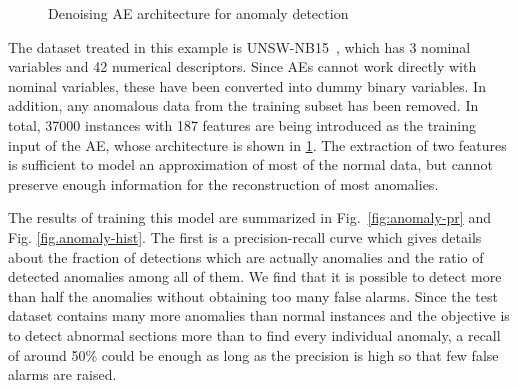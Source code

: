 \begin{figure}[ht]
    \centering\small
    \caption{Denoising AE architecture for anomaly detection}
    \label{fig:anomaly}
\end{figure}


The dataset treated in this example is UNSW-NB15~, which has 3 nominal variables and 42 numerical descriptors. Since AEs cannot work directly with nominal variables, these have been converted into dummy binary variables. In addition, any anomalous data from the training subset has been removed. In total, 37000 instances with 187 features  are being introduced as the training input of the AE, whose architecture is shown in \ref{fig:anomaly}. The extraction of two features is sufficient to model an approximation of most of the normal data, but cannot preserve enough information for the reconstruction of most anomalies. 

The results of training this model are summarized in Fig.~\ref{fig:anomaly-pr} and Fig. \ref{fig.anomaly-hist}. The first is a precision-recall curve which gives details about the fraction of detections which are actually anomalies and the ratio of detected anomalies among all of them. We find that it is possible to detect more than half the anomalies without obtaining too many false alarms. Since the test dataset contains many more anomalies than normal instances and the objective is to detect abnormal sections more than to find every individual anomaly, a recall of around 50\% could be enough as long as the precision is high so that few false alarms are raised.

